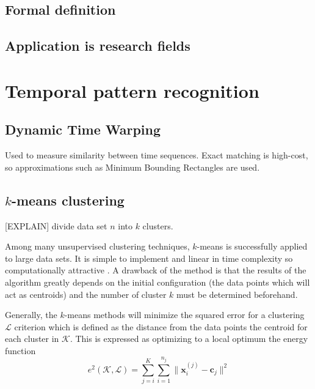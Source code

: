
\subsection{Formal definition}






\subsection{Application is research fields}



\section{Temporal pattern recognition}

\subsection{Dynamic Time Warping}
Used to measure similarity between time sequences. Exact matching is 
high-cost, so approximations such as Minimum Bounding Rectangles are used.

\subsection{$k$-means clustering}
[EXPLAIN] divide data set $n$ into $k$ clusters.

Among many unsupervised clustering techniques, $k$-means is successfully 
applied to large data sets. It is simple to implement and linear in time 
complexity so computationally attractive \cite{jain1999data}. A drawback of 
the method is that the results of the algorithm greatly depends on the initial 
configuration (the data points which will act as centroids) and the number of 
cluster $k$ must be determined beforehand.

Generally, the $k$-means methods will minimize the squared error for a 
clustering $\mathcal{L}$ criterion which is defined as the distance from the 
data points the centroid for each cluster in $\mathcal{K}$. This is expressed 
as optimizing to a local optimum the energy function
\begin{equation} \label{eq:k-means energy}
e^2(\mathcal{K},\mathcal{L}) = 
\sum_{j=i}^{K}\sum_{i=1}^{n_j}\|\mathbf{x}_i^{(j)} - 
\mathbf{c}_j\|^2
\end{equation}

